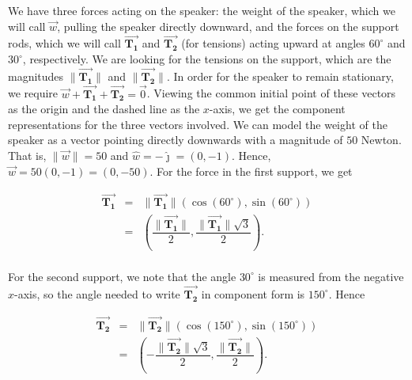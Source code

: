 \begin{example}
We have three forces acting on the speaker:  the weight of the speaker, which we will call  $\vec{w}$, pulling the speaker directly downward, and the forces on the support rods, which we will call $\overrightarrow{\mathbf{T_1}}$ and $\overrightarrow{\mathbf{T_2}}$ (for tensions) acting upward at angles $60^{\circ}$ and $30^{\circ}$, respectively.  We are looking for the tensions on the support, which are the magnitudes  $\| \overrightarrow{\mathbf{T_1}} \|$  and  $\| \overrightarrow{\mathbf{T_2}}\|$.   In order for the speaker to remain stationary, we require  $\vec{w} + \overrightarrow{\mathbf{T_1}} + \overrightarrow{\mathbf{T_2}} = \vec{0}$.  Viewing the common initial point of these vectors as the origin and the dashed line as the $x$-axis, we get the component representations for the three vectors involved. We can model the weight of the speaker as a vector pointing directly downwards with a magnitude of $50$ Newton.  That is,  $\| \vec{w} \| = 50$ and $\hat{w} = -\hat{\jmath} = \left(0,-1\right)$.  Hence, $\vec{w} = 50\left(0,-1\right) = \left(0,-50\right)$.  For the force in the first support, we get
 
\[ \begin{array}{rcl}

\overrightarrow{\mathbf{T_1}} &  = &  \| \overrightarrow{\mathbf{T_1}} \|\left(\cos\left(60^{\circ}\right), \sin\left(60^{\circ}\right)\right) \\ [8pt]
                            & =  & \left( \dfrac{\| \overrightarrow{\mathbf{T_1}} \|}{2} , \dfrac{\| \overrightarrow{\mathbf{T_1}} \|\sqrt{3}}{2}\right). \\ \end{array} \]
                            
For the second support, we note that the angle $30^{\circ}$ is measured from the negative $x$-axis, so the angle needed to write $\overrightarrow{\mathbf{T_2}}$ in component form is $150^{\circ}$.  Hence

\[ \begin{array}{rcl}

\overrightarrow{\mathbf{T_2}} & = & \| \overrightarrow{\mathbf{T_2}} \|\left(\cos\left(150^{\circ}\right), \sin\left(150^{\circ}\right)\right)\\ [8pt]
                           & =  & \left(-\dfrac{\| \overrightarrow{\mathbf{T_2}} \|\sqrt{3}}{2}, \dfrac{\| \overrightarrow{\mathbf{T_2}} \|}{2} \right). \\ \end{array} \]
                           

\end{example}

